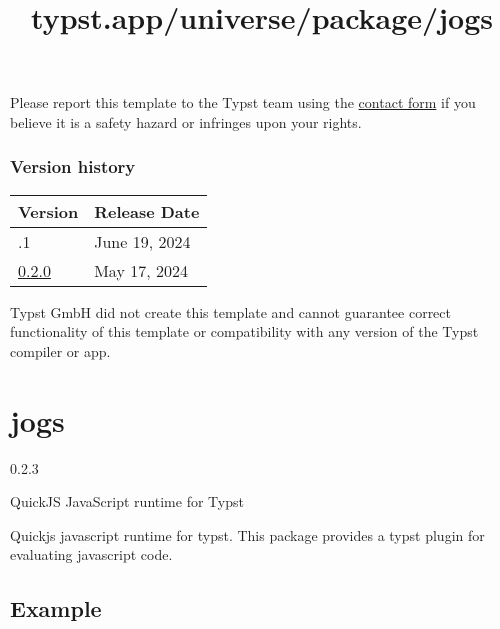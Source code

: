 Please report this template to the Typst team using the
\href{https://typst.app/contact}{contact form} if you believe it is a
safety hazard or infringes upon your rights.

\label{versions}
\subsubsection{Version history}\label{version-history}

\begin{longtable}[]{@{}ll@{}}
\toprule\noalign{}
Version & Release Date \\
\midrule\noalign{}
\endhead
\bottomrule\noalign{}
\endlastfoot
0.2.1 & June 19, 2024 \\
\href{https://typst.app/universe/package/universal-hit-thesis/0.2.0/}{0.2.0}
& May 17, 2024 \\
\end{longtable}

Typst GmbH did not create this template and cannot guarantee correct
functionality of this template or compatibility with any version of the
Typst compiler or app.


\title{typst.app/universe/package/jogs}

\label{banner}
\section{jogs}\label{jogs}

{ 0.2.3 }

QuickJS JavaScript runtime for Typst

\label{readme}
Quickjs javascript runtime for typst. This package provides a typst
plugin for evaluating javascript code.

\subsection{Example}\label{example}

